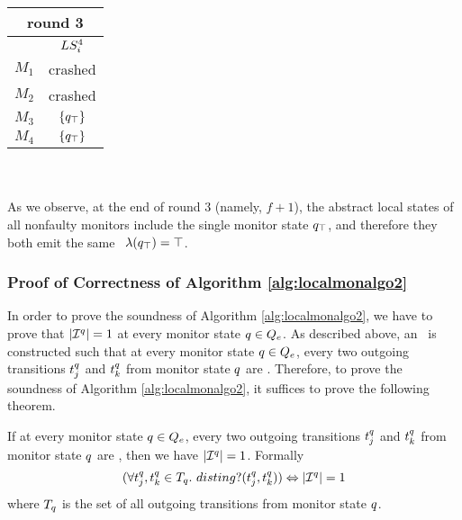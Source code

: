 \begin{tabular}{| c |c|}
\multicolumn{2}{c}{round 3} \\
\hline
&$LS_i^4$\\
\hline
$M_1$ & crashed\\
$M_2$ & crashed\\
$M_3$ & $\{q_\top\}$ \\
$M_4$ & $\{q_\top\}$ \\
\hline
\end{tabular} \\ \\



\noindent As we observe, at the end of round $3$ (namely, $f+1$), the abstract 
local states of all nonfaulty monitors include the single monitor state 
$q_\top$, and therefore they both emit the same 
\truthvalue~$\lambda(q_\top) = \top$.



\subsubsection{Proof of Correctness of Algorithm \ref{alg:localmonalgo2}}


In order to prove the soundness of Algorithm \ref{alg:localmonalgo2}, we have to 
prove that $|\mathcal{I}^{q}| =1$ at every monitor state $q \in 
Q_e$. As described above, an \Exltl~is constructed such that at every monitor 
state $q \in Q_e$, every two outgoing transitions $t_j^q$ and 
$t_k^q$ from monitor state $q$ are \dist. Therefore, to prove 
the soundness of Algorithm \ref{alg:localmonalgo2}, it suffices to prove the following theorem.



\begin{theorem}
\label{theorem:soundness}
 If at every monitor state $q \in Q_e$, every two outgoing transitions 
$t_j^q$ and $t_k^q$ from monitor state $q$ are \dist, 
then we have $|\mathcal{I}^q| =1$. Formally
$$(\forall t_j^q , t_k^q \in T_q .~ disting?(t_j^q , t_k^q)) \Leftrightarrow |\mathcal{I}^q| =1$$ where $T_q$ is the set of all outgoing transitions from monitor state $q$.

\end{theorem} 

